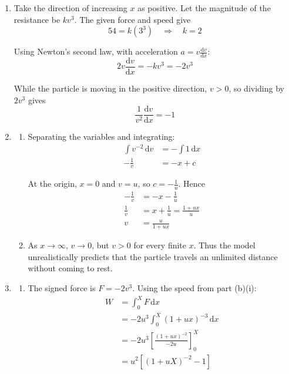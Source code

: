 \documentclass[leqno]{article}
\begin{document}
\begin{enumerate}[
  label=\textbf{\arabic*.},
  leftmargin=*,
  topsep=0pt,
  partopsep=0pt,
  parsep=0pt
]
\vspace*{10pt}

\begin{djsSolution}
\begin{enumerate}[label=\textbf{(\alph*)}, start=1]
  \item Take the direction of increasing \(x\) as positive. Let the magnitude of the resistance be \(kv^3\). The given force and speed give
  \[
  54=k(3^3)\quad\Longrightarrow\quad k=2
  \]

  Using Newton's second law, with acceleration \(a=v\frac{\mathrm{d}v}{\mathrm{d}x}\):
  \[
  2v\frac{\mathrm{d}v}{\mathrm{d}x}=-kv^3=-2v^3
  \]

  While the particle is moving in the positive direction, \(v>0\), so dividing by \(2v^3\) gives
  \[
  \frac{1}{v^2}\frac{\mathrm{d}v}{\mathrm{d}x}=-1
  \]

  \item
  \begin{enumerate}[label=(\roman*), start=1]
    \item Separating the variables and integrating:
    \begin{align*}
    \int v^{-2}\,\mathrm{d}v&=-\int 1\,\mathrm{d}x\\
    -\frac{1}{v}&=-x+c
    \end{align*}

    At the origin, \(x=0\) and \(v=u\), so \(c=-\frac{1}{u}\). Hence
    \begin{align*}
    -\frac{1}{v}&=-x-\frac{1}{u}\\
    \frac{1}{v}&=x+\frac{1}{u}=\frac{1+ux}{u}\\
    v&=\frac{u}{1+ux}
    \end{align*}

    \item As \(x\to\infty\), \(v\to0\), but \(v>0\) for every finite \(x\). Thus the model unrealistically predicts that the particle travels an unlimited distance without coming to rest.
  \end{enumerate}

  \item
  \begin{enumerate}[label=(\roman*), start=1]
    \item The signed force is \(F=-2v^3\). Using the speed from part (b)(i):
    \begin{align*}
    W&=\int_0^X F\,\mathrm{d}x\\
    &=-2u^3\int_0^X(1+ux)^{-3}\,\mathrm{d}x\\
    &=-2u^3\left[\frac{(1+ux)^{-2}}{-2u}\right]_0^X\\
    &=u^2\left[(1+uX)^{-2}-1\right]
    \end{align*}


\end{enumerate}
\end{enumerate}
\end{djsSolution}
\end{enumerate}
\end{document}
